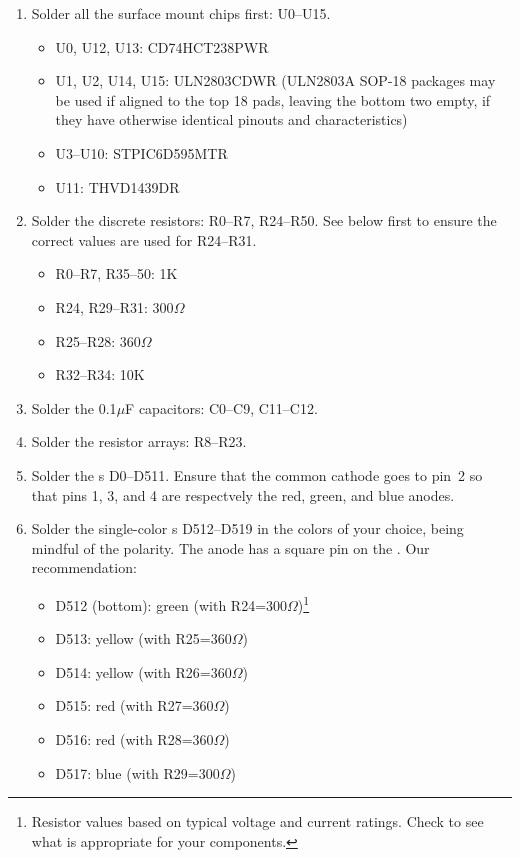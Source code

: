 \begin{enumerate}
	\item Solder all the surface mount chips first: U0--U15.
		\begin{itemize}
			\item U0, U12, U13: CD74HCT238PWR
			\item U1, U2, U14, U15: ULN2803CDWR (ULN2803A SOP-18 packages may be used if aligned to the top 18 pads, leaving the bottom two empty, if they have otherwise identical pinouts and characteristics)
			\item U3--U10: STPIC6D595MTR
			\item U11: THVD1439DR
		\end{itemize}
	\item Solder the discrete resistors: R0--R7, R24--R50. See below first to ensure the correct values are used
		for R24--R31.
		\begin{itemize}
			\item R0--R7, R35--50: 1K
			\item R24, R29--R31: 300$\Omega$
			\item R25--R28: 360$\Omega$
			\item R32--R34: 10K
		\end{itemize}
	\item Solder the 0.1$\mu$F capacitors: C0--C9, C11--C12.
	\item Solder the resistor arrays: R8--R23.
	\item Solder the  s D0--D511. Ensure that the common cathode goes to pin~2 so that pins 1, 3, and 4
		are respectvely the red, green, and blue anodes.
	\item Solder the single-color s D512--D519 in the colors of your choice, being mindful of the polarity. The anode has a square pin on the . Our recommendation:
		\begin{itemize}
			\item D512 (bottom): green (with R24=300$\Omega$)\footnote{Resistor values based on typical  voltage and current ratings. Check to see what is appropriate for your components.}
			\item D513: yellow (with R25=360$\Omega$)
			\item D514: yellow (with R26=360$\Omega$)
			\item D515: red (with R27=360$\Omega$)
			\item D516: red (with R28=360$\Omega$)
			\item D517: blue (with R29=300$\Omega$)

\end{itemize}
\end{enumerate}
